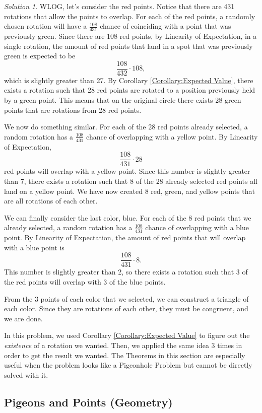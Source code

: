 \documentclass[l1pt]{article}
\theoremstyle{plain}
\theoremstyle{definition}
\theoremstyle{remark}
\newtheorem*{solution}{Solution}
\begin{document}
\begin{solution}
WLOG, let's consider the red points. Notice that there are 431 rotations that allow the points to overlap. For each of the red points, a randomly chosen rotation will have a $\frac{108}{431}$ chance of coinciding with a point that was previously green. Since there are 108 red points, by Linearity of Expectation, in a single rotation, the amount of red points that land in a spot that was previously green is expected to be \[\frac{108}{432}\cdot 108, \] which is slightly greater than 27. By Corollary \ref{Corollary:Expected Value}, there exists a rotation such that 28 red points are rotated to a position previously held by a green point. This means that on the original circle there exists 28 green points that are rotations from 28 red points.

We now do something similar. For each of the 28 red points already selected, a random rotation has a $\frac{108}{431}$ chance of overlapping with a yellow point. By Linearity of Expectation, \[\frac{108}{431}\cdot 28\] red points will overlap with a yellow point. Since this number is slightly greater than 7, there exists a rotation such that 8 of the 28 already selected red points all land on a yellow point. We have now created 8 red, green, and yellow points that are all rotations of each other.

We can finally consider the last color, blue. For each of the 8 red points that we already selected, a random rotation has a $\frac{108}{431}$ chance of overlapping with a blue point. By Linearity of Expectation, the amount of red points that will overlap with a blue point is \[\frac{108}{431}\cdot 8.\] This number is slightly greater than 2, so there exists a rotation such that 3 of the red points will overlap with 3 of the blue points. 

From the 3 points of each color that we selected, we can construct a triangle of each color. Since they are rotations of each other, they must be congruent, and we are done.
\end{solution}

In this problem, we used Corollary \ref{Corollary:Expected Value} to figure out the \emph{existence} of a rotation we wanted. Then, we applied the same idea 3 times in order to get the result we wanted. The Theorems in this section are especially useful when the problem looks like a Pigeonhole Problem but cannot be directly solved with it.

\subsection{Pigeons and Points (Geometry)}
\end{document}
